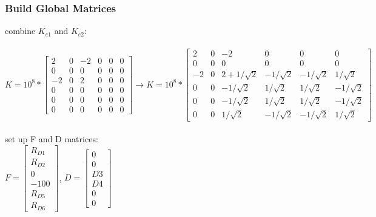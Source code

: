 \documentclass{article}
\begin{document}
\subsubsection*{Build Global Matrices}
combine $K_{e1}$ and $K_{e2}$: \\\\
$K=10^8*\begin{bmatrix}
    2 & 0 & -2 & 0 & 0 & 0 \\
    0 & 0 & 0 & 0 & 0 & 0 \\
    -2 & 0 & 2 & 0 & 0 & 0 \\
    0 & 0 & 0 & 0 & 0 & 0 \\
    0 & 0 & 0 & 0 & 0 & 0 \\
    0 & 0 & 0 & 0 & 0 & 0
\end{bmatrix}\rightarrow K=10^8*\begin{bmatrix}
    2 & 0 & -2 & 0 & 0 & 0 \\
    0 & 0 & 0 & 0 & 0 & 0 \\
    -2 & 0 & 2+1/\sqrt{2} & -1/\sqrt{2} & -1/\sqrt{2} & 1/\sqrt{2} \\
    0 & 0 & -1/\sqrt{2} & 1/\sqrt{2} & 1/\sqrt{2} & -1/\sqrt{2} \\
    0 & 0 & -1/\sqrt{2} & 1/\sqrt{2} & 1/\sqrt{2} & -1/\sqrt{2} \\
    0 & 0 & 1/\sqrt{2} & -1/\sqrt{2} & -1/\sqrt{2} & 1/\sqrt{2}
\end{bmatrix}$ \\\\
set up F and D matrices: \\
$F=\begin{bmatrix}
    R_{D1} \\ R_{D2} \\ 0 \\ -100 \\ R_{D5} \\ R_{D6}
\end{bmatrix}$, \quad
$D=\begin{bmatrix}
    0 \\ 0 \\ D3 \\ D4 \\ 0 \\ 0
\end{bmatrix}$
\end{document}
